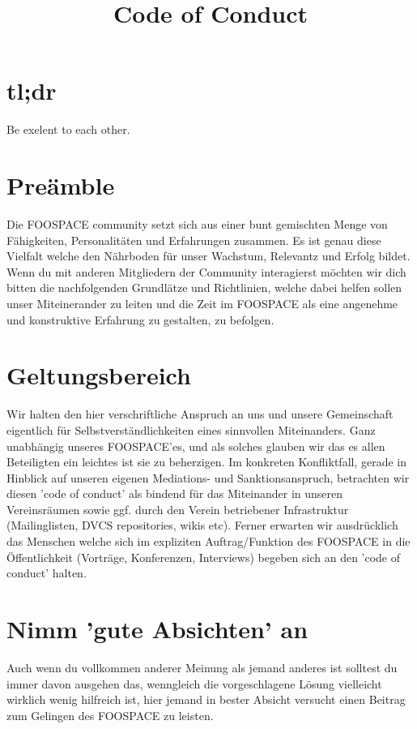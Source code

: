 \documentclass[10pt,a4paper]{article}
\begin{document}
\title{Code of Conduct}
\section*{tl;dr}
Be exelent to each other.

\section*{Preämble}
Die FOOSPACE community setzt sich aus einer bunt gemischten Menge von
Fähigkeiten, Personalitäten und Erfahrungen zusammen. Es ist genau diese
Vielfalt welche den Nährboden für unser Wachstum, Relevantz und Erfolg bildet.
Wenn du mit anderen Mitgliedern der Community interagierst möchten wir dich
bitten die nachfolgenden Grundlätze und Richtlinien, welche dabei helfen sollen
unser Miteinerander zu leiten und die Zeit im FOOSPACE als eine angenehme und
konstruktive Erfahrung zu gestalten, zu befolgen.

\section*{Geltungsbereich}
Wir halten den hier verschriftliche Anspruch an uns und unsere Gemeinschaft
eigentlich für Selbstverständlichkeiten eines sinnvollen Miteinanders. Ganz
unabhängig unseres FOOSPACE'es, und als solches glauben wir das es allen
Beteiligten ein leichtes ist sie zu beherzigen.  Im konkreten Konfliktfall,
gerade in Hinblick auf unseren eigenen Mediations- und Sanktionsanspruch,
betrachten wir diesen 'code of conduct' als bindend für das Miteinander in
unseren Vereinsräumen sowie ggf. durch den Verein betriebener Infrastruktur
(Mailinglisten, DVCS repositories, wikis etc). Ferner erwarten wir ausdrücklich
das Menschen welche sich im expliziten Auftrag/Funktion des FOOSPACE in die
Öffentlichkeit (Vorträge, Konferenzen, Interviews) begeben sich an den 'code of
conduct' halten.

\section{Nimm 'gute Absichten' an}
Auch wenn du vollkommen anderer Meinung als jemand anderes ist solltest du
immer davon ausgehen das, wenngleich die vorgeschlagene Lösung vielleicht
wirklich wenig hilfreich ist, hier jemand in bester Absicht versucht einen
Beitrag zum Gelingen des FOOSPACE zu leisten.
\end{document}
